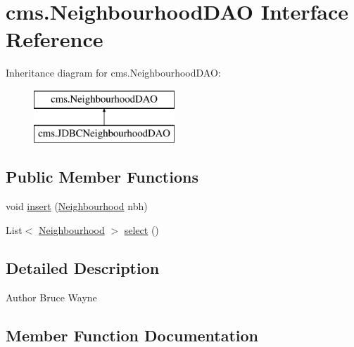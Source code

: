 \hypertarget{interfacecms_1_1_neighbourhood_d_a_o}{}\section{cms.\+Neighbourhood\+D\+AO Interface Reference}
\label{interfacecms_1_1_neighbourhood_d_a_o}
Inheritance diagram for cms.\+Neighbourhood\+D\+AO\+:\begin{figure}[H]
\begin{center}
\leavevmode
\includegraphics[height=2.000000cm]{interfacecms_1_1_neighbourhood_d_a_o}
\end{center}
\end{figure}
\subsection*{Public Member Functions}
\begin{DoxyCompactItemize}
\item 
void \mbox{\hyperlink{interfacecms_1_1_neighbourhood_d_a_o_a6c9c689191c76d5be69f892f58a35494}{insert}} (\mbox{\hyperlink{classcms_1_1_neighbourhood}{Neighbourhood}} nbh)
\item 
List$<$ \mbox{\hyperlink{classcms_1_1_neighbourhood}{Neighbourhood}} $>$ \mbox{\hyperlink{interfacecms_1_1_neighbourhood_d_a_o_af9fd7094c23742d68b86f0a83f544f9d}{select}} ()
\end{DoxyCompactItemize}


\subsection{Detailed Description}
\begin{DoxyAuthor}{Author}
Bruce Wayne 
\end{DoxyAuthor}


\subsection{Member Function Documentation}
\mbox{\label{interfacecms_1_1_neighbourhood_d_a_o_a6c9c689191c76d5be69f892f58a35494}} 
